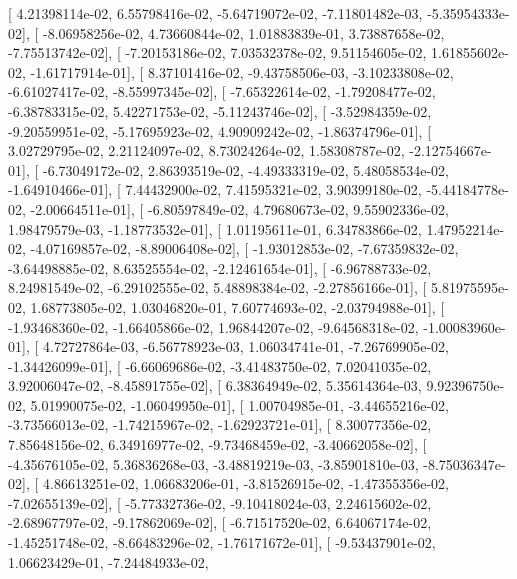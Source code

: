 \documentclass{article}
\begin{document}
       [  4.21398114e-02,   6.55798416e-02,  -5.64719072e-02,
         -7.11801482e-03,  -5.35954333e-02],
       [ -8.06958256e-02,   4.73660844e-02,   1.01883839e-01,
          3.73887658e-02,  -7.75513742e-02],
       [ -7.20153186e-02,   7.03532378e-02,   9.51154605e-02,
          1.61855602e-02,  -1.61717914e-01],
       [  8.37101416e-02,  -9.43758506e-03,  -3.10233808e-02,
         -6.61027417e-02,  -8.55997345e-02],
       [ -7.65322614e-02,  -1.79208477e-02,  -6.38783315e-02,
          5.42271753e-02,  -5.11243746e-02],
       [ -3.52984359e-02,  -9.20559951e-02,  -5.17695923e-02,
          4.90909242e-02,  -1.86374796e-01],
       [  3.02729795e-02,   2.21124097e-02,   8.73024264e-02,
          1.58308787e-02,  -2.12754667e-01],
       [ -6.73049172e-02,   2.86393519e-02,  -4.49333319e-02,
          5.48058534e-02,  -1.64910466e-01],
       [  7.44432900e-02,   7.41595321e-02,   3.90399180e-02,
         -5.44184778e-02,  -2.00664511e-01],
       [ -6.80597849e-02,   4.79680673e-02,   9.55902336e-02,
          1.98479579e-03,  -1.18773532e-01],
       [  1.01195611e-01,   6.34783866e-02,   1.47952214e-02,
         -4.07169857e-02,  -8.89006408e-02],
       [ -1.93012853e-02,  -7.67359832e-02,  -3.64498885e-02,
          8.63525554e-02,  -2.12461654e-01],
       [ -6.96788733e-02,   8.24981549e-02,  -6.29102555e-02,
          5.48898384e-02,  -2.27856166e-01],
       [  5.81975595e-02,   1.68773805e-02,   1.03046820e-01,
          7.60774693e-02,  -2.03794988e-01],
       [ -1.93468360e-02,  -1.66405866e-02,   1.96844207e-02,
         -9.64568318e-02,  -1.00083960e-01],
       [  4.72727864e-03,  -6.56778923e-03,   1.06034741e-01,
         -7.26769905e-02,  -1.34426099e-01],
       [ -6.66069686e-02,  -3.41483750e-02,   7.02041035e-02,
          3.92006047e-02,  -8.45891755e-02],
       [  6.38364949e-02,   5.35614364e-03,   9.92396750e-02,
          5.01990075e-02,  -1.06049950e-01],
       [  1.00704985e-01,  -3.44655216e-02,  -3.73566013e-02,
         -1.74215967e-02,  -1.62923721e-01],
       [  8.30077356e-02,   7.85648156e-02,   6.34916977e-02,
         -9.73468459e-02,  -3.40662058e-02],
       [ -4.35676105e-02,   5.36836268e-03,  -3.48819219e-03,
         -3.85901810e-03,  -8.75036347e-02],
       [  4.86613251e-02,   1.06683206e-01,  -3.81526915e-02,
         -1.47355356e-02,  -7.02655139e-02],
       [ -5.77332736e-02,  -9.10418024e-03,   2.24615602e-02,
         -2.68967797e-02,  -9.17862069e-02],
       [ -6.71517520e-02,   6.64067174e-02,  -1.45251748e-02,
         -8.66483296e-02,  -1.76171672e-01],
       [ -9.53437901e-02,   1.06623429e-01,  -7.24484933e-02,
\end{document}
